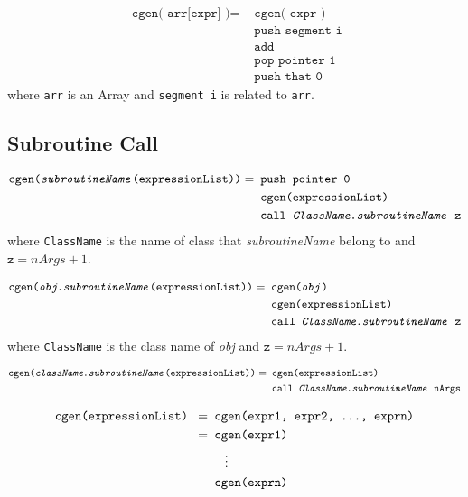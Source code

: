 \documentclass[a4paper]{book}
\begin{document}
\begin{align*}
    \texttt{ cgen( arr[expr] )} = & \texttt{ cgen( expr )} \\
    & \texttt{ push segment i} \\
    & \texttt{ add } \\
    & \texttt{ pop pointer 1} \\
    & \texttt{ push that 0}
\end{align*}
where \texttt{arr} is an Array and \colorbox{bl}{\texttt{segment i}} is related to \texttt{arr}.


\subsection*{Subroutine Call}
\begin{align*}
    \texttt{cgen(\textit{subroutineName}(expressionList))} = & \texttt{ push pointer 0} \\
    & \texttt{ cgen(expressionList)} \\
    & \texttt{ call \textit{ClassName}.\textit{subroutineName} z}
\end{align*}
where \colorbox{bl}{\texttt{ClassName}} is the name of class that \textit{subroutineName} belong to and
$\texttt{z} = nArgs + 1$.

\begin{align*}
    \texttt{cgen(\textit{obj}.\textit{subroutineName}(expressionList))} = & \texttt{ cgen(\textit{obj}) } \\
    & \texttt{ cgen(expressionList)} \\
    & \texttt{ call \textit{ClassName}.\textit{subroutineName} z}
\end{align*}
where \colorbox{bl}{\texttt{ClassName}} is the class name of \textit{obj} and
$\texttt{z} = nArgs + 1$.

\begin{align*}
    \texttt{cgen(\textit{className}.\textit{subroutineName}(expressionList))} = & \texttt{ cgen(expressionList)} \\
    & \texttt{ call \textit{ClassName}.\textit{subroutineName} nArgs}
\end{align*}


\begin{align*}
    \texttt{ cgen(expressionList) } = & \texttt{ cgen(expr1, expr2, \dots, exprn) } \\
    = & \texttt{ cgen(expr1)} \\
      & ~ ~ ~ ~ \vdots \\
      & \texttt{ cgen(exprn)}
\end{align*}
\end{document}
